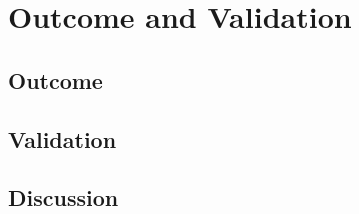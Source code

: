\chapter{Outcome and Validation}
\vspace{-1.4em}



\section{Outcome}




\section{Validation}






\section{Discussion}